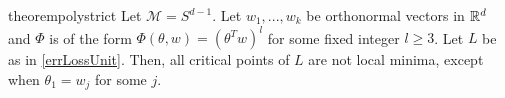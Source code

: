 \begin{restatable}{theorem}{polystrict}
\label{PolyStrict}
Let $\mathcal{M} = S^{d-1}$. Let $w_1,...,w_k$ be orthonormal vectors in ${\mathbb{R}}^d$ and $\Phi$ is of the form $\Phi(\theta,w) = (\theta^Tw)^l$ for some fixed integer $l \geq 3$. Let $L$ be as in \eqref{errLossUnit}. Then, all critical points of $L$ are not local minima, except when $\theta_1 = w_j$ for some $j$.   
\end{restatable}


